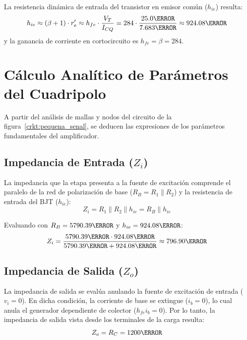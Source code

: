 La resistencia dinámica de entrada del transistor en emisor común ($h_{ie}$) resulta:
\begin{equation}
  h_{ie} \approx (\beta + 1) \cdot r_e' \approx h_{fe} \cdot \frac{V_T}{I_{CQ}} = 284 \cdot \frac{25.0\mV}{7.683\mA} \approx 924.08\ohm
  \label{eq:hie_calculo}
\end{equation}
y la ganancia de corriente en cortocircuito es $h_{fe} = \beta = 284$.

\section{Cálculo Analítico de Parámetros del Cuadripolo}

A partir del análisis de mallas y nodos del circuito de la figura~\ref{crkt:pequena_senal}, se deducen las expresiones
de los parámetros fundamentales del amplificador.

\subsection{Impedancia de Entrada (\texorpdfstring{$Z_i$}{Zi})}
La impedancia que la etapa presenta a la fuente de excitación comprende el paralelo de la red de polarización de base
($R_B = R_1 \parallel R_2$) y la resistencia de entrada del BJT ($h_{ie}$):
\begin{equation}
  Z_i = R_1 \parallel R_2 \parallel h_{ie} = R_B \parallel h_{ie}
  \label{eq:Zi_formula}
\end{equation}

Evaluando con $R_B = 5790.39\ohm$ y $h_{ie} = 924.08\ohm$:
\begin{equation}
  Z_i = \frac{5790.39\ohm \cdot 924.08\ohm}{5790.39\ohm + 924.08\ohm} \approx 796.90\ohm
  \label{eq:Zi_teorica}
\end{equation}

\subsection{Impedancia de Salida (\texorpdfstring{$Z_o$}{Zo})}
La impedancia de salida se evalúa anulando la fuente de excitación de entrada ($v_i = 0$). En dicha condición, la
corriente de base se extingue ($i_b = 0$), lo cual anula el generador dependiente de colector ($h_{fe} i_b = 0$).
Por lo tanto, la impedancia de salida vista desde los terminales de la carga resulta:
\begin{equation}
  Z_o = R_C = 1200\ohm
  \label{eq:Zo_teorica}
\end{equation}

